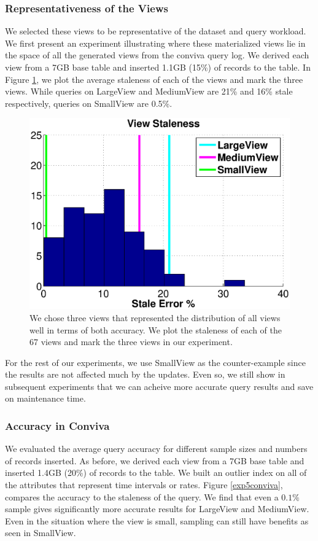 \subsubsection{Representativeness of the Views}
We selected these views to be representative of the dataset and query workload. 
We first present an experiment illustrating where these materialized views lie in the space of all the generated views from the conviva query log.
We derived each view from a 7GB base table and inserted 1.1GB (15\%) of records to the table. 
In Figure \ref{exp12conviva}, we plot the average staleness of each of the views and mark the three views.
While queries on LargeView and MediumView are 21\% and 16\% stale respectively, queries on SmallView are 0.5\%.
\begin{figure}[ht!]
\centering
\includegraphics[scale=0.25]{exp/conviva_efficiency_accuracy.eps}
 \caption{We chose three views that represented the distribution of all views well in terms of both accuracy. We plot the staleness of each of the 67 views and mark the three views in our experiment.\label{exp12conviva}}
\end{figure}
For the rest of our experiments, we use SmallView as the counter-example since the results are not affected much by the updates.
Even so, we still show in subsequent experiments that we can acheive more accurate query results and save on maintenance time.

\subsubsection{Accuracy in Conviva}
We evaluated the average query accuracy for different sample sizes and numbers of records inserted.
As before, we derived each view from a 7GB base table and inserted 1.4GB (20\%) of records to the table. 
We built an outlier index on all of the attributes that represent time intervals or rates.
Figure \ref{exp5conviva}, compares the accuracy to the staleness of the query.
We find that even a $0.1\%$ sample gives significantly more accurate results for LargeView and MediumView.
Even in the situation where the view is small, sampling can still have benefits as seen in SmallView.


